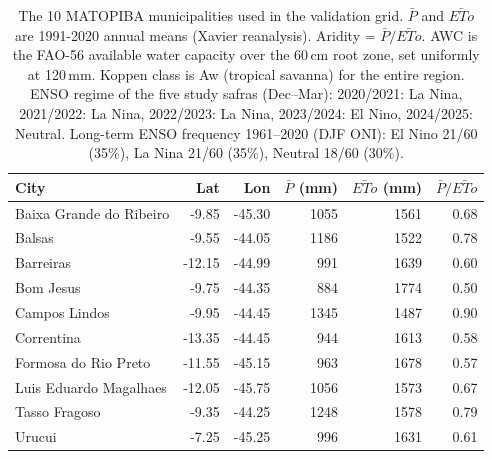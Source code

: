 \begin{table}[t]
\centering
\caption{The 10 MATOPIBA municipalities used in the validation grid. $\bar{P}$ and $\bar{ETo}$ are 1991-2020 annual means (Xavier reanalysis). Aridity = $\bar{P}/\bar{ETo}$. AWC is the FAO-56 available water capacity over the 60\,cm root zone, set uniformly at 120\,mm. Koppen class is Aw (tropical savanna) for the entire region. ENSO regime of the five study safras (Dec--Mar): 2020/2021: La Nina, 2021/2022: La Nina, 2022/2023: La Nina, 2023/2024: El Nino, 2024/2025: Neutral. Long-term ENSO frequency 1961--2020 (DJF ONI): El Nino 21/60 (35\%), La Nina 21/60 (35\%), Neutral 18/60 (30\%).}
\label{tab:study-cities}
\begin{tabular}{lrrrrr}
\toprule
City & Lat & Lon & $\bar{P}$ (mm) & $\bar{ETo}$ (mm) & $\bar{P}/\bar{ETo}$ \\
\midrule
Baixa Grande do Ribeiro & -9.85 & -45.30 & 1055 & 1561 & 0.68 \\
Balsas & -9.55 & -44.05 & 1186 & 1522 & 0.78 \\
Barreiras & -12.15 & -44.99 & 991 & 1639 & 0.60 \\
Bom Jesus & -9.75 & -44.35 & 884 & 1774 & 0.50 \\
Campos Lindos & -9.95 & -44.45 & 1345 & 1487 & 0.90 \\
Correntina & -13.35 & -44.45 & 944 & 1613 & 0.58 \\
Formosa do Rio Preto & -11.55 & -45.15 & 963 & 1678 & 0.57 \\
Luis Eduardo Magalhaes & -12.05 & -45.75 & 1056 & 1573 & 0.67 \\
Tasso Fragoso & -9.35 & -44.25 & 1248 & 1578 & 0.79 \\
Urucui & -7.25 & -45.25 & 996 & 1631 & 0.61 \\
\bottomrule
\end{tabular}
\end{table}